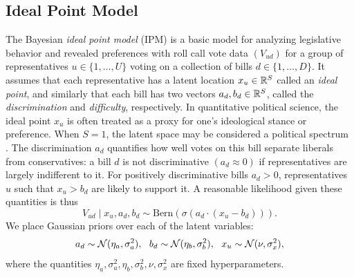 \documentclass{article}
\begin{document}
\subsection{Ideal Point Model} 
The Bayesian {\sl ideal point model} (IPM) \cite{Clinton2004} is a basic model for analyzing legislative behavior and revealed preferences with roll call vote data $(V_{ud})$ for a group of representatives $u \in \{1,\ldots, U\}$ voting on a collection of bills $d \in \{1,\ldots,D\}$. It assumes that each representative has a latent location $x_u\in\mathbb{R}^S$ called an {\sl ideal point}, and similarly that each bill has two vectors $a_d,b_d\in\mathbb{R}^S$, called the {\sl discrimination} and {\sl difficulty}, respectively. In quantitative political science, the ideal point $x_u$ is often treated as a proxy for one's ideological stance or preference. When $S=1$, the latent space may be considered a political spectrum \cite{Martin2002}. The discrimination $a_d$ quantifies how well votes on this bill separate liberals from conservatives: a bill $d$ is not discriminative $(a_d\approx 0)$ if representatives are largely indifferent to it. For positively discriminative bills $a_d > 0$, representatives $u$ such that $x_u > b_d$ are likely to support it. A reasonable likelihood given these quantities is thus
\begin{equation}
V_{ud} \mid x_u, a_d, b_d \sim \text{Bern}(\sigma(a_d\cdot(x_u-b_d))).
\end{equation}
We place Gaussian priors over each of the latent variables:
\begin{equation}
a_d \sim \mathcal{N}(\eta_{a},\sigma^2_{a}), ~~
b_d \sim \mathcal{N}(\eta_{b},\sigma^2_{b}), ~~
x_u\sim \mathcal{N}(\nu,\sigma^2_x),
\end{equation}
where the quantities $\eta_{a},\sigma^2_{a},\eta_{b},\sigma^2_{b},\nu,\sigma^2_x$ are fixed hyperparameters.

\end{document}
